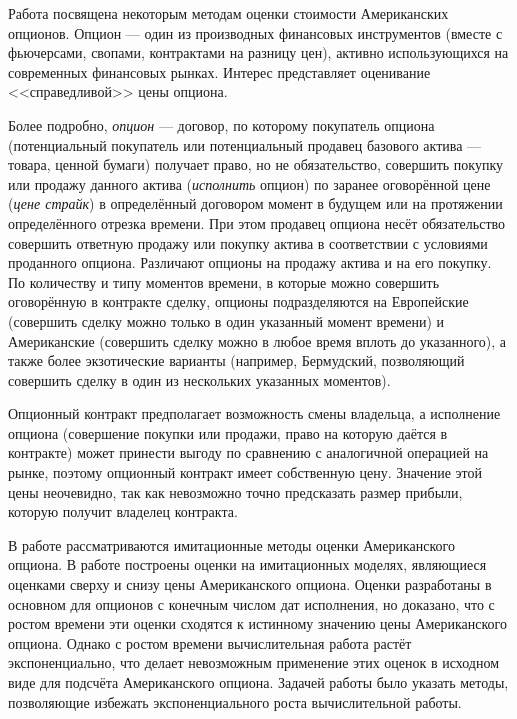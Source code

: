 \intro
Работа посвящена некоторым методам оценки стоимости Американских опционов. Опцион --- один из производных финансовых инструментов (вместе с фьючерсами, свопами, контрактами на разницу цен), активно использующихся на современных финансовых рынках. Интерес представляет оценивание <<справедливой>> цены опциона.

Более подробно, \emph{опцион} --- договор, по которому покупатель опциона (потенциальный покупатель или потенциальный продавец базового актива — товара, ценной бумаги) получает право, но не обязательство, совершить покупку или продажу данного актива (\emph{исполнить} опцион) по заранее оговорённой цене (\emph{цене страйк}) в определённый договором момент в будущем или на протяжении определённого отрезка времени. При этом продавец опциона несёт обязательство совершить ответную продажу или покупку актива в соответствии с условиями проданного опциона. Различают опционы на продажу актива и на его покупку. По количеству и типу моментов времени, в которые можно совершить оговорённую в контракте сделку, опционы подразделяются на Европейские (совершить сделку можно только в один указанный момент времени) и Американские (совершить сделку можно в любое время вплоть до указанного), а также более экзотические варианты (например, Бермудский, позволяющий совершить сделку в один из нескольких указанных моментов).

Опционный контракт предполагает возможность смены владельца, а исполнение опциона (совершение покупки или продажи, право на которую даётся в контракте) может принести выгоду по сравнению с аналогичной операцией на рынке, поэтому опционный контракт имеет собственную цену. Значение этой цены неочевидно, так как невозможно точно предсказать размер прибыли, которую получит владелец контракта.

В работе рассматриваются имитационные методы оценки Американского опциона. В работе \cite{Broadie1997} построены оценки на имитационных моделях, являющиеся оценками сверху и снизу цены Американского опциона. Оценки разработаны в основном для опционов с конечным числом дат исполнения, но доказано, что с ростом времени эти оценки сходятся к истинному значению цены Американского опциона. Однако с ростом времени вычислительная работа растёт экспоненциально, что делает невозможным применение этих оценок в исходном виде для подсчёта Американского опциона. Задачей работы было указать методы, позволяющие избежать экспоненциального роста вычислительной работы.

